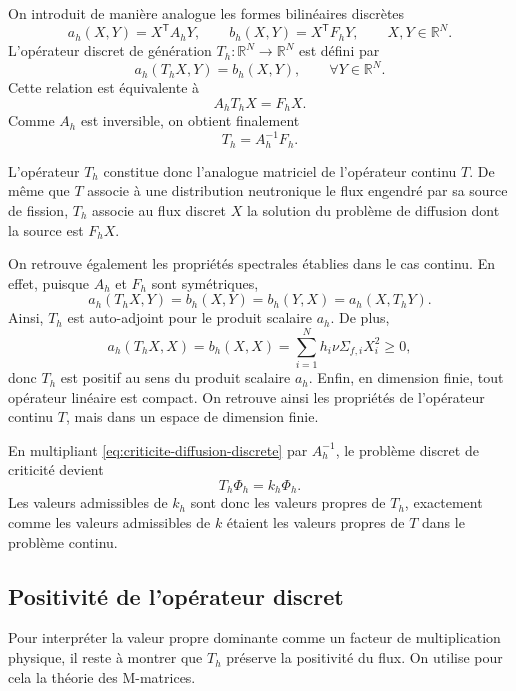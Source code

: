 \documentclass{article}
\begin{document}
On introduit de manière analogue les formes bilinéaires discrètes
\[
    a_h(X,Y)=X^{\mathsf T}A_hY,
    \qquad
    b_h(X,Y)=X^{\mathsf T}F_hY,
    \qquad X,Y\in\mathbb{R}^N.
\]
L'opérateur discret de génération $T_h:\mathbb{R}^N\to\mathbb{R}^N$
est défini par
\begin{equation}
    a_h(T_hX,Y)=b_h(X,Y),
    \qquad \forall Y\in\mathbb{R}^N.
    \label{eq:definition-Th}
\end{equation}
Cette relation est équivalente à
\[
    A_hT_hX=F_hX.
\]
Comme $A_h$ est inversible, on obtient finalement
\begin{equation}
    \boxed{T_h=A_h^{-1}F_h.}
    \label{eq:operateur-generation-discret}
\end{equation}

L'opérateur $T_h$ constitue donc l'analogue matriciel de l'opérateur
continu $T$. De même que $T$ associe à une distribution neutronique le
flux engendré par sa source de fission, $T_h$ associe au flux discret
$X$ la solution du problème de diffusion dont la source est $F_hX$.

On retrouve également les propriétés spectrales établies dans le cas
continu. En effet, puisque $A_h$ et $F_h$ sont symétriques,
\[
    a_h(T_hX,Y)
    =
    b_h(X,Y)
    =
    b_h(Y,X)
    =
    a_h(X,T_hY).
\]
Ainsi, $T_h$ est auto-adjoint pour le produit scalaire $a_h$. De plus,
\[
    a_h(T_hX,X)
    =
    b_h(X,X)
    =
    \sum_{i=1}^{N}
    h_i\nu\Sigma_{f,i}X_i^2
    \geq0,
\]
donc $T_h$ est positif au sens du produit scalaire $a_h$. Enfin, en
dimension finie, tout opérateur linéaire est compact. On retrouve ainsi
les propriétés de l'opérateur continu $T$, mais dans un espace de
dimension finie.

En multipliant \eqref{eq:criticite-diffusion-discrete} par $A_h^{-1}$,
le problème discret de criticité devient
\begin{equation}
    T_h\Phi_h=k_h\Phi_h.
    \label{eq:probleme-propre-Th}
\end{equation}
Les valeurs admissibles de $k_h$ sont donc les valeurs propres de
$T_h$, exactement comme les valeurs admissibles de $k$ étaient les
valeurs propres de $T$ dans le problème continu.

\subsection {Positivité de l'opérateur discret}

Pour interpréter la valeur propre dominante comme un facteur de
multiplication physique, il reste à montrer que $T_h$ préserve la
positivité du flux. On utilise pour cela la théorie des M-matrices.
\end{document}
